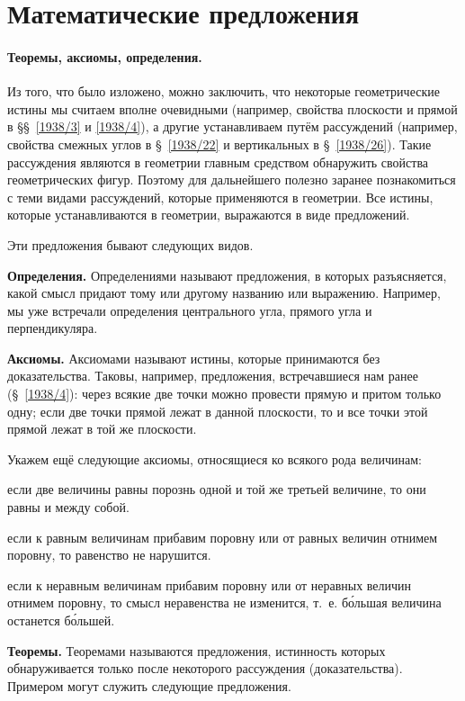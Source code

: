 \documentclass[oneside]{book}
\begin{document}
\section{Математические предложения}



\paragraph{Теоремы, аксиомы, определения.}\label{1938/28}
Из того, что было изложено, можно заключить, что некоторые геометрические истины мы считаем вполне очевидными (например, свойства плоскости и прямой в §§~\ref{1938/3} и \ref{1938/4}), а другие устанавливаем путём рассуждений (например, свойства смежных углов в §~\ref{1938/22} и вертикальных в §~\ref{1938/26}).
Такие рассуждения являются в геометрии главным средством обнаружить свойства геометрических фигур.
Поэтому для дальнейшего полезно заранее познакомиться с теми видами рассуждений, которые применяются в геометрии.
Все истины, которые устанавливаются в геометрии, выражаются в виде предложений.

Эти предложения бывают следующих видов.

\textbf{Определения.}
Определениями называют предложения, в которых разъясняется, какой смысл придают тому или другому названию или выражению.
Например, мы уже встречали определения центрального угла, прямого угла и перпендикуляра.

\textbf{Аксиомы.}
Аксиомами называют истины, которые принимаются без доказательства.
Таковы, например, предложения, встречавшиеся нам ранее (§~\ref{1938/4}):
через всякие две точки можно провести прямую и притом только одну;
если две точки прямой лежат в данной плоскости, то и все точки этой прямой лежат в той же плоскости.

Укажем ещё следующие аксиомы, относящиеся ко всякого рода величинам:

если две величины равны порознь одной и той же третьей величине, то они равны и между собой.

если к равным величинам прибавим поровну или от равных величин отнимем поровну, то равенство не нарушится.

если к неравным величинам прибавим поровну или от неравных величин отнимем поровну, то смысл неравенства не изменится, т.~е. б\'{о}льшая величина останется б\'{о}льшей.

\textbf{Теоремы.}
Теоремами называются предложения, истинность которых обнаруживается только после некоторого рассуждения (доказательства).
Примером могут служить следующие предложения.
\end{document}
